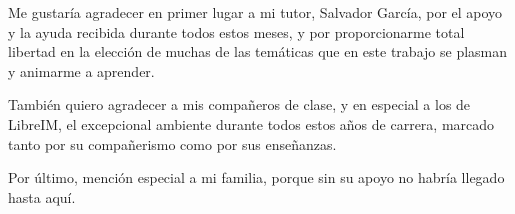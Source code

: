 Me gustaría agradecer en primer lugar a mi tutor, Salvador García, por el apoyo y la ayuda recibida durante
todos estos meses, y por proporcionarme total libertad en la elección de muchas de las temáticas que en 
este trabajo se plasman y animarme a aprender.

También quiero agradecer a mis compañeros de clase, y en especial a los de LibreIM, el excepcional ambiente 
durante todos estos años de carrera, marcado tanto por su compañerismo como por sus enseñanzas.

Por último, mención especial a mi familia, porque sin su apoyo no habría llegado hasta aquí.